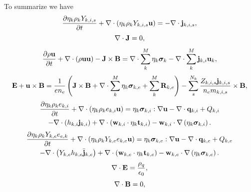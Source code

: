 \documentclass[a4paper,11pt]{report}
\begin{document}
To summarize we have
\begin{equation}
    \label{eq:sf_mm_ms_ni_final}
    \frac{\partial \eta_k \rho_k Y_{k,i,s}}{\partial t} + \nabla \cdot \left( \eta_k \rho_k Y_{k,i,s} \mathbf{u} \right) = -\nabla \cdot \mathbf{j}_{k,i,s},
\end{equation}
\begin{equation}
    \label{eq:sf_mm_ms_ne_final}
    \nabla \cdot \mathbf{J} = 0,
\end{equation}
\begin{equation}
    \label{eq:sf_mm_ms_ui_final}
    \frac{\partial \rho \mathbf{u}}{\partial t} + \nabla \cdot \left( \rho \mathbf{u} \mathbf{u} \right) - \mathbf{J} \times \mathbf{B} = \nabla \cdot \sum_k^M \eta_k \bm \sigma_k - \nabla \cdot \sum_k^M \mathbf{j}_{k,i} \mathbf{u}_{k},
\end{equation}
\begin{equation}
    \label{eq:sf_mm_ms_ue_final}
    \mathbf{E} + \mathbf{u} \times \mathbf{B} = \frac{1}{e n_e} \left( \mathbf{J} \times \mathbf{B} + \nabla \cdot \sum_k^M \eta_k \bm \sigma_{k,e} + \sum_k^M \mathbf{R}_{k,e} \right) - \sum_s^{N_k} \frac{Z_{k,i,s} \mathbf{j}_{k,i,s}}{n_e m_{k,i,s}} \times \mathbf{B},
\end{equation}
\begin{multline}
    \label{eq:sf_mm_ms_iei_final}
    \frac{\partial \eta_k \rho_k e_{k,i}}{\partial t} + \nabla \cdot \left( \eta_k \rho_k e_{k,i} \mathbf{u} \right) = \eta_k \bm \sigma_{k,i} : \nabla \mathbf{u} - \nabla \cdot \mathbf{q}_{k,i} + Q_{k,i} \\
    - \nabla \cdot \left( h_{k,i} \mathbf{j}_{k,i} \right) + \nabla \cdot \left( \mathbf{w}_{k,i} \cdot \eta_k \mathbf{t}_{k,i} \right) - \mathbf{w}_{k,i} \cdot \nabla \left( \eta_k \bm \sigma_{k,i} \right).
\end{multline}
\begin{multline}
    \label{eq:sf_mm_ms_iee_final}
    \frac{\partial \eta_k \rho_k Y_{k,e} e_{e,k}}{\partial t} + \nabla \cdot \left( \eta_k \rho_k Y_{k,e} e_{k,e} \mathbf{u} \right) = \eta_k \bm \sigma_{k,e} : \nabla \mathbf{u} - \nabla \cdot \mathbf{q}_{k,e} + Q_{k,e} \\
    - \nabla \cdot \left( Y_{k,e} h_{k,e} \bar{\mathbf{j}}_{k,e} \right) + \nabla \cdot \left( \mathbf{w}_{k,e} \cdot \eta_k \mathbf{t}_{k,e} \right) - \mathbf{w}_{k,e} \cdot \nabla \left( \eta_k \bm \sigma_{k,e} \right).
\end{multline}
\begin{equation}
    \label{eq:sf_mm_ms_maxwell_3_final}
    \nabla \cdot \mathbf{E} = \frac{\rho_q}{\epsilon_0},
\end{equation}
\begin{equation}
    \label{eq:sf_mm_ms_maxwell_4_final}
    \nabla \cdot \mathbf{B} = 0,
\end{equation}
\end{document}
